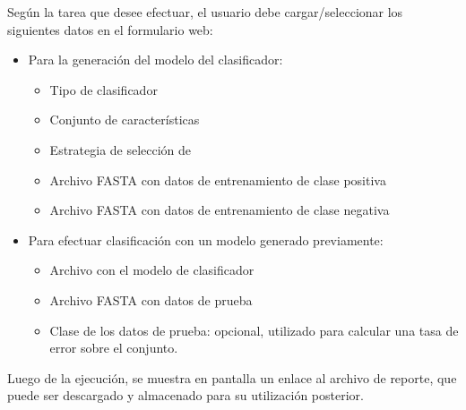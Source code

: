 Según la tarea que desee efectuar, el usuario debe cargar/seleccionar
los siguientes datos en el formulario web:
%
\begin{itemize}
\item
  {Para la generación del modelo del clasificador}:
  \begin{itemize}
  \item
    Tipo de clasificador
  \item
    Conjunto de características
  \item
    Estrategia de selección de 
  \item
    Archivo FASTA con datos de entrenamiento de clase positiva
  \item
    Archivo FASTA con datos de entrenamiento de clase negativa
  \end{itemize}
\item
  {Para efectuar clasificación con un modelo generado previamente}:
  \begin{itemize}
  \item
    Archivo con el modelo de clasificador
  \item
    Archivo FASTA con datos de prueba
  \item
    Clase de los datos de prueba: opcional, utilizado para calcular
    una tasa de error sobre el conjunto.
  \end{itemize}
\end{itemize}
%
Luego de la ejecución, se muestra en pantalla un enlace al archivo de
reporte, que puede ser descargado y almacenado para su utilización
posterior.
